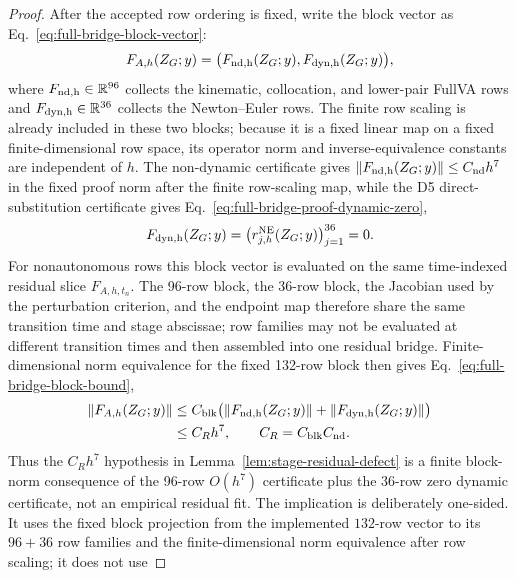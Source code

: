 \documentclass[preprint,12pt]{elsarticle}
\begin{document}
\begin{proof}
After the accepted row ordering is fixed, write the block vector as
Eq.~\eqref{eq:full-bridge-block-vector}:
\begin{equation}
\label{eq:full-bridge-block-vector}
  F_{A,h}(Z_G;y)=
  \bigl(F_{\rm nd,h}(Z_G;y),F_{\rm dyn,h}(Z_G;y)\bigr),
\end{equation}
where \(F_{\rm nd,h}\in\mathbb R^{96}\) collects the kinematic, collocation,
and lower-pair FullVA rows and \(F_{\rm dyn,h}\in\mathbb R^{36}\) collects the
Newton--Euler rows.  The finite row scaling is already included in these two
blocks; because it is a fixed linear map on a fixed finite-dimensional row
space, its operator norm and inverse-equivalence constants are independent of
\(h\).  The non-dynamic certificate gives
\(\|F_{\rm nd,h}(Z_G;y)\|\le C_{\rm nd}h^7\) in the fixed proof norm after
the finite row-scaling map, while the D5 direct-substitution certificate gives
Eq.~\eqref{eq:full-bridge-proof-dynamic-zero},
\begin{equation}
\label{eq:full-bridge-proof-dynamic-zero}
  F_{\rm dyn,h}(Z_G;y)
  =\bigl(r^{\rm NE}_{j,h}(Z_G;y)\bigr)_{j=1}^{36}=0 .
\end{equation}
For nonautonomous rows this block vector is evaluated on the same
time-indexed residual slice \(F_{A,h,t_n}\).  The 96-row block, the 36-row
block, the Jacobian used by the perturbation criterion, and the endpoint map
therefore share the same transition time and stage abscissae; row families may
not be evaluated at different transition times and then assembled into one
residual bridge.
Finite-dimensional norm equivalence for the
fixed 132-row block then gives Eq.~\eqref{eq:full-bridge-block-bound},
\begin{equation}
\label{eq:full-bridge-block-bound}
\begin{aligned}
  \|F_{A,h}(Z_G;y)\|
  &\le C_{\rm blk}\bigl(\|F_{\rm nd,h}(Z_G;y)\|
       +\|F_{\rm dyn,h}(Z_G;y)\|\bigr) \\
  &\le C_Rh^7,\qquad C_R=C_{\rm blk}C_{\rm nd}.
\end{aligned}
\end{equation}
Thus the \(C_Rh^7\) hypothesis in Lemma~\ref{lem:stage-residual-defect} is a
finite block-norm consequence of the 96-row \(O(h^7)\) certificate plus the
36-row zero dynamic certificate, not an empirical residual fit.
The implication is deliberately one-sided.  It uses the fixed block projection
from the implemented \(132\)-row vector to its \(96+36\) row families and the
finite-dimensional norm equivalence after row scaling; it does not use

\end{proof}
\end{document}

